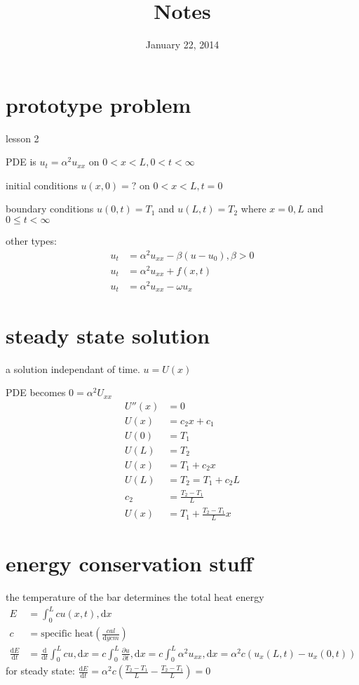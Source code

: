 \documentclass{article}
\begin{document}
\title{Notes}
\date{January 22, 2014}
\maketitle

\section*{prototype problem}
lesson 2

PDE is $u_t=\alpha^2u_{xx}$ on $0<x<L,0<t<\infty$

initial conditions $u(x,0)=?$ on $0<x<L,t=0$

boundary conditions $u(0,t)=T_1$ and $u(L,t)=T_2$ where $x=0,L$ and $0\leq t<\infty$

other types:
\begin{align*}
  u_t&=\alpha^2 u_{xx}-\beta (u-u_0), \beta > 0\\
  u_t&=\alpha^2 u_{xx}+f(x,t)\\
  u_t&=\alpha^2 u_{xx}-\omega u_x
\end{align*}

\section*{steady state solution}
a solution independant of time. $u=U(x)$

PDE becomes $0=\alpha^2 U_{xx}$
\begin{align*}
  U''(x)&=0\\
  U(x)&=c_2x+c_1\\
  U(0)&=T_1\\
  U(L)&=T_2\\
  U(x)&=T_1+c_2x\\
  U(L)&=T_2=T_1+c_2L\\
  c_2&=\frac{T_2-T_1}{L}\\
  U(x)&=T_1+\frac{T_2-T_1}{L}x
\end{align*}
\section*{energy conservation stuff}
the temperature of the bar determines the total heat energy
\begin{align*}
  E&=\int_0^L{cu(x,t),\mathrm{d}x}\\
  c&=\text{specific heat} \left(\frac{cal}{\mathrm{d}y cm}\right)\\
  \frac{\mathrm{d}E}{\mathrm{d}t}&=\frac{\mathrm{d}}{\mathrm{d}t}\int_0^L{cu,\mathrm{d}x}=c\int_0^L{\frac{\partial u}{\partial t},\mathrm{d}x}=c\int_0^L{\alpha^2 u_{xx},\mathrm{d}x}=\alpha^2 c(u_x(L,t)-u_x(0,t))
\end{align*}
for steady state: $\frac{\mathrm{d}E}{\mathrm{d}t}=\alpha^2 c(\frac{T_2-T_1}{L}-\frac{T_2-T_1}{L})=0$
\end{document}
